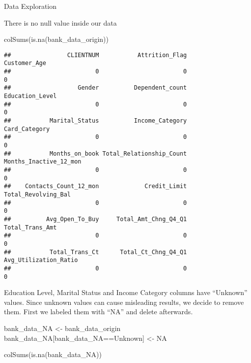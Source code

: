 \documentclass[
]{article}
\newenvironment{Shaded}{\begin{snugshade}}{\end{snugshade}}
\newcommand{\ConstantTok}[1]{\textcolor[rgb]{0.00,0.00,0.00}{#1}}
\newcommand{\FunctionTok}[1]{\textcolor[rgb]{0.00,0.00,0.00}{#1}}
\newcommand{\NormalTok}[1]{#1}
\newcommand{\OtherTok}[1]{\textcolor[rgb]{0.56,0.35,0.01}{#1}}
\newcommand{\SpecialCharTok}[1]{\textcolor[rgb]{0.00,0.00,0.00}{#1}}
\newcommand{\StringTok}[1]{\textcolor[rgb]{0.31,0.60,0.02}{#1}}
\begin{document}
Data Exploration

There is no null value inside our data

\begin{Shaded}
\begin{Highlighting}[]
\FunctionTok{colSums}\NormalTok{(}\FunctionTok{is.na}\NormalTok{(bank\_data\_origin))}
\end{Highlighting}
\end{Shaded}

\begin{verbatim}
##                CLIENTNUM           Attrition_Flag             Customer_Age 
##                        0                        0                        0 
##                   Gender          Dependent_count          Education_Level 
##                        0                        0                        0 
##           Marital_Status          Income_Category            Card_Category 
##                        0                        0                        0 
##           Months_on_book Total_Relationship_Count   Months_Inactive_12_mon 
##                        0                        0                        0 
##    Contacts_Count_12_mon             Credit_Limit      Total_Revolving_Bal 
##                        0                        0                        0 
##          Avg_Open_To_Buy     Total_Amt_Chng_Q4_Q1          Total_Trans_Amt 
##                        0                        0                        0 
##           Total_Trans_Ct      Total_Ct_Chng_Q4_Q1    Avg_Utilization_Ratio 
##                        0                        0                        0
\end{verbatim}

Education Level, Marital Status and Income Category columns have
``Unknown'' values. Since unknown values can cause misleading results,
we decide to remove them. First we labeled them with ``NA'' and delete
afterwards.

\begin{Shaded}
\begin{Highlighting}[]
\NormalTok{bank\_data\_NA }\OtherTok{\textless{}{-}}\NormalTok{ bank\_data\_origin}
\NormalTok{bank\_data\_NA[bank\_data\_NA}\SpecialCharTok{==}\StringTok{\textquotesingle{}Unknown\textquotesingle{}}\NormalTok{] }\OtherTok{\textless{}{-}} \ConstantTok{NA}

\FunctionTok{colSums}\NormalTok{(}\FunctionTok{is.na}\NormalTok{(bank\_data\_NA))}
\end{Highlighting}
\end{Shaded}
\end{document}
